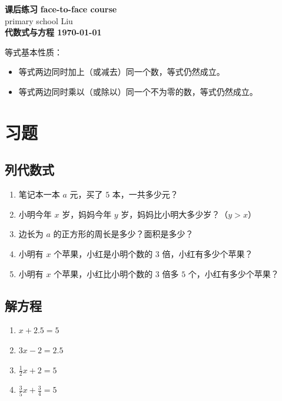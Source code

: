 \documentclass[DIN, pagenumber=false, fontsize=11pt, parskip=half]{scrartcl}
\newcommand{\mytitle}[1]{{\noindent\Large\textbf{#1}}}
\begin{document}
\noindent\textbf{课后练习} \hfill \textbf{face-to-face course}\\
primary school \hfill Liu\\

\mytitle{代数式与方程 \hfill \today}
\newline
\begin{parchmentquote}
    等式基本性质：
    \begin{itemize}
        \item 等式两边同时加上（或减去）同一个数，等式仍然成立。
        \item 等式两边同时乘以（或除以）同一个不为零的数，等式仍然成立。
    \end{itemize}
   


\end{parchmentquote}

\section{习题}

\subsection{列代数式}

\begin{enumerate}
    \item  笔记本一本 $a$ 元，买了 $5$ 本，一共多少元？
    \item 小明今年 $x$ 岁，妈妈今年 $y$ 岁，妈妈比小明大多少岁？（$y > x$）
    \item 边长为 $a$ 的正方形的周长是多少？面积是多少？
    \item 小明有 $x$ 个苹果，小红是小明个数的 $3$ 倍，小红有多少个苹果？
    \item 小明有 $x$ 个苹果，小红比小明个数的 $3$ 倍多 $5$ 个，小红有多少个苹果？
\end{enumerate}


\subsection{解方程}
\begin{enumerate}
    \item $x + 2.5 = 5$
    \item $3x - 2 = 2.5$
    \item $\frac{1}{2}x + 2 = 5$
    \item $\frac{3}{5}x + \frac{3}{4} = 5$
  
\end{enumerate}
\end{document}
